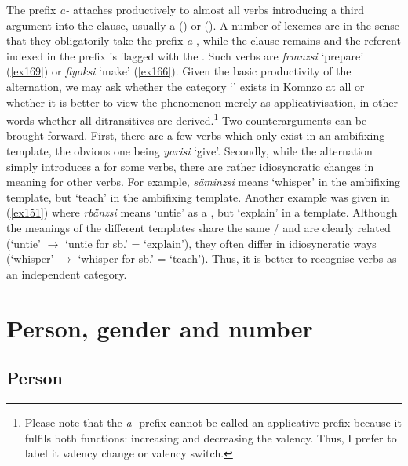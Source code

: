 The  prefix \emph{a-} attaches productively to almost all  verbs introducing a third argument into the clause, usually a  () or  (). A number of lexemes are  in the sense that they obligatorily take the  prefix \emph{a-}, while the clause remains  and the referent indexed in the prefix is flagged with the  . Such  verbs are \emph{frmnzsi} `prepare' (\ref{ex169}) or \emph{fiyoksi} `make' (\ref{ex166}). Given the basic productivity of the  alternation, we may ask whether the category `' exists in Komnzo at all or whether it is better to view the phenomenon merely as applicativisation, in other words whether all ditransitives are derived.\footnote{Please note that the \emph{a-} prefix cannot be called an applicative prefix because it fulfils both functions: increasing and decreasing the valency. Thus, I prefer to label it valency change or valency switch.} Two counterarguments can be brought forward. First, there are a few verbs which only exist in an ambifixing  template, the obvious one being \emph{yarisi} `give'. Secondly, while the  alternation simply introduces a  for some verbs, there are rather idiosyncratic changes in meaning for other verbs. For example, \emph{säminzsi} means `whisper' in the ambifixing  template, but `teach' in the ambifixing  template. Another example was given in (\ref{ex151}) where \emph{rbänzsi} means `untie' as a , but `explain' in a  template. Although the meanings of the different templates share the same / and are clearly related (`untie' $\rightarrow$ `untie for sb.' = `explain'), they often differ in idiosyncratic ways (`whisper' $\rightarrow$ `whisper for sb.' = `teach'). Thus, it is better to recognise  verbs as an independent category.

\section{Person, gender and number} \label{persgendnumber}

\subsection{Person} \label{personsection}

